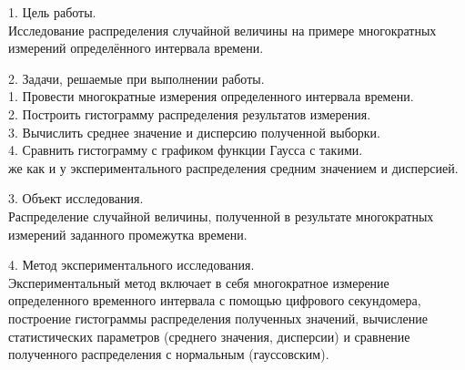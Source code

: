 \documentclass[12pt]{article}
\begin{document}
\noindent\makebox[\linewidth]{\rule{\textwidth}{1pt}}
\noindent\makebox[\linewidth]{\rule{\textwidth}{1pt}}

\begin{flushleft}
    1. Цель работы.\\
    Исследование распределения случайной величины на примере
    многократных измерений определённого интервала времени.
\end{flushleft}

\begin{flushleft}
    2. Задачи, решаемые при выполнении работы.\\
    \hspace{0.63cm} 1. Провести многократные измерения определенного интервала времени.\\
    \hspace{0.63cm} 2. Построить гистограмму распределения результатов измерения.\\
    \hspace{0.63cm} 3. Вычислить среднее значение и дисперсию полученной выборки.\\
    \hspace{0.63cm} 4. Сравнить гистограмму с графиком функции Гаусса с такими.\\
    \hspace{0.63cm} же как и у экспериментального распределения средним значением и дисперсией.\\
\end{flushleft}

\begin{flushleft}
    3. Объект исследования. \\
    Распределение случайной величины, полученной в результате многократных измерений заданного промежутка времени. \\
\end{flushleft}

\begin{flushleft}
    4. Метод экспериментального исследования. \\
    Экспериментальный метод включает в себя многократное измерение определенного 
    временного интервала с помощью цифрового секундомера, построение гистограммы 
    распределения полученных значений, вычисление статистических параметров 
    (среднего значения, дисперсии) и сравнение полученного распределения с 
    нормальным (гауссовским). \\
\end{flushleft}
\end{document}
